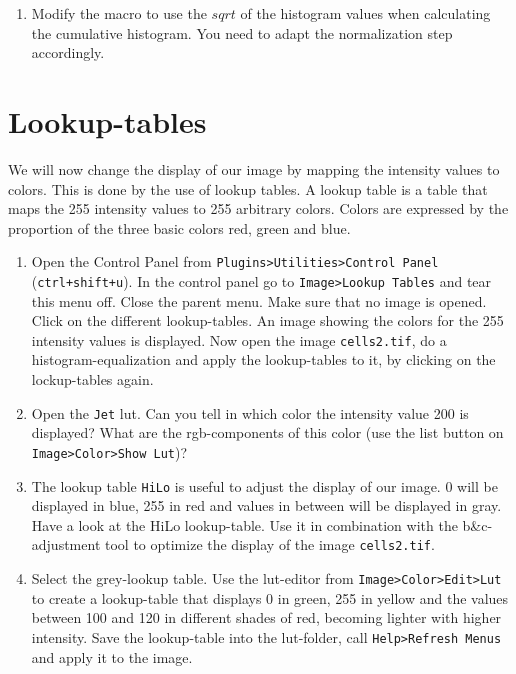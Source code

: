 \begin{enumerate}
\begin{enumerate}[1]
\item Modify the macro to use the $sqrt$ of the histogram values when calculating the cumulative histogram. You need to adapt the normalization step accordingly.

\end{enumerate}

\end{enumerate}

\section{Lookup-tables}

We will now change the display of our image by mapping the intensity values to colors. This is done by the use of lookup tables. A lookup table is a table that maps the 255 intensity values to 255 arbitrary colors. Colors are expressed by the proportion of the three basic colors red, green and blue.

\begin{enumerate}

\item Open the Control Panel from \texttt{Plugins>Utilities>Control Panel} (\texttt{ctrl+shift+u}). In the control panel go to \texttt{Image>Lookup Tables} and tear this menu off. Close the parent menu. Make sure that no image is opened. Click on the different lookup-tables. An image showing the colors for the 255 intensity values is displayed. Now open the image \texttt{cells2.tif}, do a histogram-equalization and apply the lookup-tables to it, by clicking on the lockup-tables again.

\item Open the \texttt{Jet} lut. Can you tell in which color the intensity value 200 is displayed? What are the rgb-components of this color (use the list button on \texttt{Image>Color>Show Lut})?

\fbox{
	\begin{minipage}{\linewidth}
		\hfill\vspace{1cm}
	\end{minipage}
	}
	
\item The lookup table \texttt{HiLo} is useful to adjust the display of our image. 0 will be displayed in
blue, 255 in red and values in between will be displayed in gray. Have a look at the HiLo lookup-table. Use it in combination with the b\&c-adjustment tool to optimize the display of the image \texttt{cells2.tif}.
	
\item Select the grey-lookup table. Use the lut-editor from \texttt{Image>Color>Edit>Lut} to create a lookup-table that displays 0 in green, 255 in yellow and the values between 100 and 120 in different shades of red, becoming lighter with higher intensity. Save the lookup-table into the lut-folder, call \texttt{Help>Refresh Menus} and apply it to the image.

\end{enumerate}

